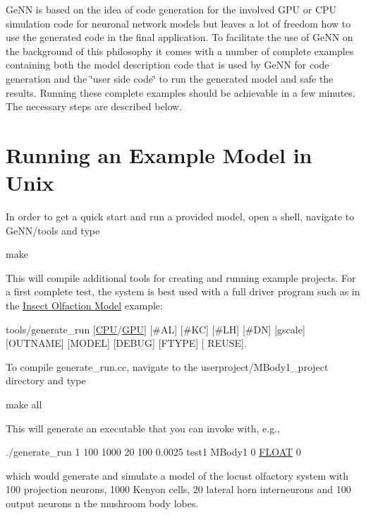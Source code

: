 Ge\+N\+N is based on the idea of code generation for the involved G\+P\+U or C\+P\+U simulation code for neuronal network models but leaves a lot of freedom how to use the generated code in the final application. To facilitate the use of Ge\+N\+N on the background of this philosophy it comes with a number of complete examples containing both the model description code that is used by Ge\+N\+N for code generation and the \char`\"{}user side code\char`\"{} to run the generated model and safe the results. Running these complete examples should be achievable in a few minutes. The necessary steps are described below.\hypertarget{Quickstart_unix_quick}{}\section{Running an Example Model in Unix}\label{Quickstart_unix_quick}
In order to get a quick start and run a provided model, open a shell, navigate to {\ttfamily Ge\+N\+N/tools} and type 
\begin{DoxyCode}
make
\end{DoxyCode}
 This will compile additional tools for creating and running example projects. For a first complete test, the system is best used with a full driver program such as in the \hyperlink{Examples_ex_mbody}{Insect Olfaction Model} example\+: 
\begin{DoxyCode}
tools/generate\_run [\hyperlink{modelSpec_8h_ad703205f9a4d4bb6af9c25257c23ce6d}{CPU}/\hyperlink{modelSpec_8h_a39cb9803524b6f3b783344b2f89867b4}{GPU}] [#AL] [#KC] [#LH] [#DN] [gscale] [OUTNAME] [MODEL] [DEBUG] [FTYPE] [
      REUSE]. 
\end{DoxyCode}


To compile {\ttfamily generate\+\_\+run.\+cc}, navigate to the {\ttfamily userproject/\+M\+Body1\+\_\+project} directory and type 
\begin{DoxyCode}
make all
\end{DoxyCode}
 This will generate an executable that you can invoke with, e.\+g., 
\begin{DoxyCode}
./generate\_run 1 100 1000 20 100 0.0025 test1 MBody1 0 \hyperlink{modelSpec_8h_ae8690abbffa85934d64d545920e2b108}{FLOAT} 0
\end{DoxyCode}
 which would generate and simulate a model of the locust olfactory system with 100 projection neurons, 1000 Kenyon cells, 20 lateral horn interneurons and 100 output neurons n the mushroom body lobes.

